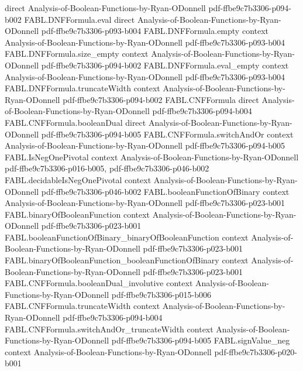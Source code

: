 \begin{theorem}
  {direct}
  {Analysis-of-Boolean-Functions-by-Ryan-ODonnell}
  {pdf-ffbe9c7b3306-p094-b002}
\proofstep
  {FABL.DNFFormula.eval}
  {direct}
  {Analysis-of-Boolean-Functions-by-Ryan-ODonnell}
  {pdf-ffbe9c7b3306-p093-b004}
\proofstep
  {FABL.DNFFormula.empty}
  {context}
  {Analysis-of-Boolean-Functions-by-Ryan-ODonnell}
  {pdf-ffbe9c7b3306-p093-b004}
\proofstep
  {FABL.DNFFormula.size_empty}
  {context}
  {Analysis-of-Boolean-Functions-by-Ryan-ODonnell}
  {pdf-ffbe9c7b3306-p094-b002}
\proofstep
  {FABL.DNFFormula.eval_empty}
  {context}
  {Analysis-of-Boolean-Functions-by-Ryan-ODonnell}
  {pdf-ffbe9c7b3306-p093-b004}
\proofstep
  {FABL.DNFFormula.truncateWidth}
  {context}
  {Analysis-of-Boolean-Functions-by-Ryan-ODonnell}
  {pdf-ffbe9c7b3306-p094-b002}
\proofstep
  {FABL.CNFFormula}
  {direct}
  {Analysis-of-Boolean-Functions-by-Ryan-ODonnell}
  {pdf-ffbe9c7b3306-p094-b004}
\proofstep
  {FABL.CNFFormula.booleanDual}
  {direct}
  {Analysis-of-Boolean-Functions-by-Ryan-ODonnell}
  {pdf-ffbe9c7b3306-p094-b005}
\proofstep
  {FABL.CNFFormula.switchAndOr}
  {context}
  {Analysis-of-Boolean-Functions-by-Ryan-ODonnell}
  {pdf-ffbe9c7b3306-p094-b005}
\proofstep
  {FABL.IsNegOnePivotal}
  {context}
  {Analysis-of-Boolean-Functions-by-Ryan-ODonnell}
  {pdf-ffbe9c7b3306-p016-b005,
    pdf-ffbe9c7b3306-p046-b002}
\proofstep
  {FABL.decidableIsNegOnePivotal}
  {context}
  {Analysis-of-Boolean-Functions-by-Ryan-ODonnell}
  {pdf-ffbe9c7b3306-p046-b002}
\proofstep
  {FABL.booleanFunctionOfBinary}
  {context}
  {Analysis-of-Boolean-Functions-by-Ryan-ODonnell}
  {pdf-ffbe9c7b3306-p023-b001}
\proofstep
  {FABL.binaryOfBooleanFunction}
  {context}
  {Analysis-of-Boolean-Functions-by-Ryan-ODonnell}
  {pdf-ffbe9c7b3306-p023-b001}
\proofstep
  {FABL.booleanFunctionOfBinary_binaryOfBooleanFunction}
  {context}
  {Analysis-of-Boolean-Functions-by-Ryan-ODonnell}
  {pdf-ffbe9c7b3306-p023-b001}
\proofstep
  {FABL.binaryOfBooleanFunction_booleanFunctionOfBinary}
  {context}
  {Analysis-of-Boolean-Functions-by-Ryan-ODonnell}
  {pdf-ffbe9c7b3306-p023-b001}
\proofstep
  {FABL.CNFFormula.booleanDual_involutive}
  {context}
  {Analysis-of-Boolean-Functions-by-Ryan-ODonnell}
  {pdf-ffbe9c7b3306-p015-b006}
\proofstep
  {FABL.CNFFormula.truncateWidth}
  {context}
  {Analysis-of-Boolean-Functions-by-Ryan-ODonnell}
  {pdf-ffbe9c7b3306-p094-b004}
\proofstep
  {FABL.CNFFormula.switchAndOr_truncateWidth}
  {context}
  {Analysis-of-Boolean-Functions-by-Ryan-ODonnell}
  {pdf-ffbe9c7b3306-p094-b005}
\proofstep
  {FABL.signValue_neg}
  {context}
  {Analysis-of-Boolean-Functions-by-Ryan-ODonnell}
  {pdf-ffbe9c7b3306-p020-b001}

\end{theorem}

